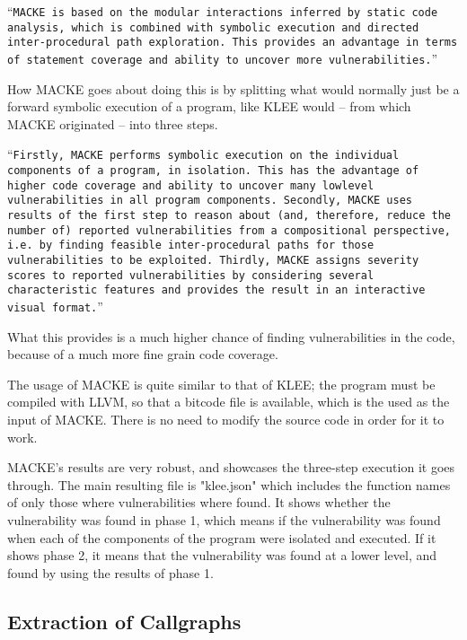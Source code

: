 \enquote{\texttt{MACKE is based on the modular interactions inferred
		by static code analysis, which is combined with symbolic execution
		and directed inter-procedural path exploration. This
		provides an advantage in terms of statement coverage and
		ability to uncover more vulnerabilities.}}\parencite{ognawala}
	
How MACKE goes about doing this is by splitting what would normally just be a forward symbolic execution of a program, like KLEE would -- from which MACKE originated -- into three steps.

\enquote{\texttt{Firstly,
		MACKE performs symbolic execution on the individual components
		of a program, in isolation. This has the advantage
		of higher code coverage and ability to uncover many lowlevel
		vulnerabilities in all program components. Secondly,
		MACKE uses results of the first step to reason about (and,
		therefore, reduce the number of) reported vulnerabilities
		from a compositional perspective, i.e. by finding feasible
		inter-procedural paths for those vulnerabilities to be exploited.
		Thirdly, MACKE assigns severity scores to reported
		vulnerabilities by considering several characteristic features
		and provides the result in an interactive visual format.}}\parencite{ognawala}
	
What this provides is a much higher chance of finding vulnerabilities in the code, because of a much more fine grain code coverage.

The usage of MACKE is quite similar to that of KLEE; the program must be compiled with LLVM, so that a bitcode file is available, which is the used as the input of MACKE. There is no need to modify the source code in order for it to work.

MACKE's results are very robust, and showcases the three-step execution it goes through. The main resulting file is "klee.json" which includes the function names of only those where vulnerabilities where found. 
It shows whether the vulnerability was found in phase 1, which means if the vulnerability was found when each of the components of the program were isolated and executed. If it shows phase 2, it means that the vulnerability was found at a lower level, and found by using the results of phase 1. 

\subsection{Extraction of Callgraphs} 

